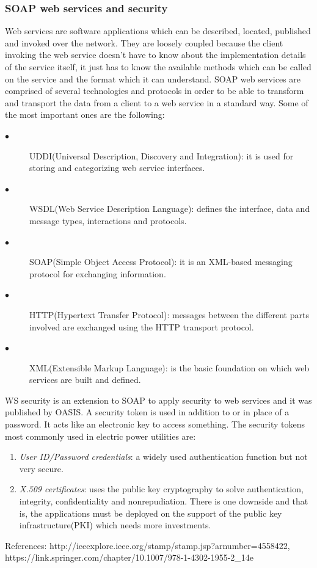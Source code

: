 \documentclass[twosided,a4,10pt]{article}
\begin{document}
\begin{multicols}{2}
  	\subsubsection{SOAP web services and security}
  	 Web services are software applications which can be described, located, published and invoked over the network. They are loosely coupled because the client invoking the web service doesn't have to know about the implementation details of the service itself, it just has to know the available methods which can be called on the service and the format which it can understand. SOAP web services are comprised of several technologies and protocols in order to be able to transform and transport the data from a client to a web service in a standard way. Some of the most important ones are the following:
  	\begin{description}
  		\item[$\bullet$] 
  		UDDI(Universal Description, Discovery and Integration): it is used for storing and categorizing web service interfaces.
  		\item[$\bullet$]
  		WSDL(Web Service Description Language): defines the interface, data and message types, interactions and protocols.
  		\item[$\bullet$]
  		SOAP(Simple Object Access Protocol): it is an XML-based messaging protocol for exchanging information.
  		\item[$\bullet$]
  		HTTP(Hypertext Transfer Protocol): messages between the different parts involved are exchanged using the HTTP transport protocol.
  		\item[$\bullet$]
  		XML(Extensible Markup Language): is the basic foundation on which web services are built and defined.
  	\end{description} 	
  	WS security is an extension to SOAP to apply security to web services and it was published by OASIS. A security token is used in addition to or in place of a password. It acts like an electronic key to access something. The security tokens most commonly used in electric power utilities are:
  	\begin{enumerate}
  		\item \textit{User ID/Password credentials}: a widely used authentication function but not very secure.
  		\item \textit{X.509 certificates}: uses the public key cryptography to solve authentication, integrity, confidentiality and nonrepudiation. There is one downside and that is, the applications must be deployed on the support of the public key infrastructure(PKI) which needs more investments. 
  	\end{enumerate}
  	References: 
  	http://ieeexplore.ieee.org/stamp/stamp.jsp?arnumber=4558422,
  	https://link.springer.com/chapter/10.1007/978-1-4302-1955-2\_14e

\end{multicols}
\end{document}
